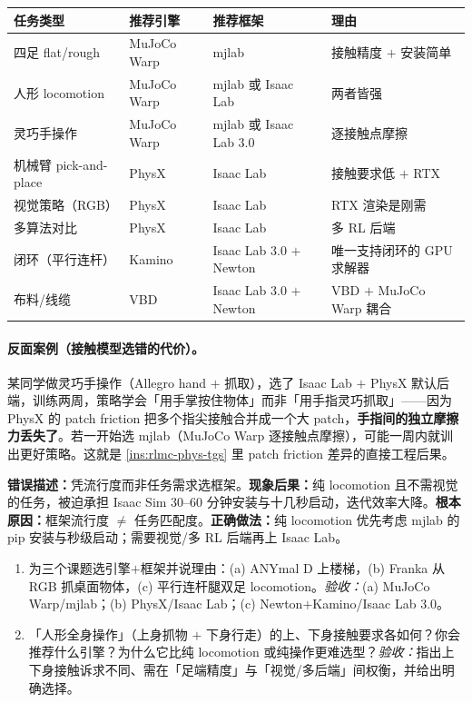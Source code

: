 \begin{center}
\small
\begin{tabular}{@{}llll@{}}
\toprule
任务类型 & 推荐引擎 & 推荐框架 & 理由 \\
\midrule
四足 flat/rough & MuJoCo Warp & mjlab & 接触精度 $+$ 安装简单 \\
人形 locomotion & MuJoCo Warp & mjlab 或 Isaac Lab & 两者皆强 \\
灵巧手操作 & MuJoCo Warp & mjlab 或 Isaac Lab 3.0 & 逐接触点摩擦 \\
机械臂 pick-and-place & PhysX & Isaac Lab & 接触要求低 $+$ RTX \\
视觉策略（RGB） & PhysX & Isaac Lab & RTX 渲染是刚需 \\
多算法对比 & PhysX & Isaac Lab & 多 RL 后端 \\
闭环（平行连杆） & Kamino & Isaac Lab 3.0 $+$ Newton & 唯一支持闭环的 GPU 求解器 \\
布料/线缆 & VBD & Isaac Lab 3.0 $+$ Newton & VBD $+$ MuJoCo Warp 耦合 \\
\bottomrule
\end{tabular}
\end{center}

\paragraph{反面案例（接触模型选错的代价）。}某同学做灵巧手操作（Allegro hand $+$ 抓取），选了 Isaac Lab $+$ PhysX 默认后端，训练两周，策略学会「用手掌按住物体」而非「用手指灵巧抓取」——因为 PhysX 的 patch friction 把多个指尖接触合并成一个大 patch，\textbf{手指间的独立摩擦力丢失了}。若一开始选 mjlab（MuJoCo Warp 逐接触点摩擦），可能一周内就训出更好策略。这就是 \cref{ins:rlmc-phys-tgs} 里 patch friction 差异的直接工程后果。

\begin{pitfall}
\textbf{错误描述：}凭流行度而非任务需求选框架。\textbf{现象后果：}纯 locomotion 且不需视觉的任务，被迫承担 Isaac Sim 30--60 分钟安装与十几秒启动，迭代效率大降。\textbf{根本原因：}框架流行度 $\neq$ 任务匹配度。\textbf{正确做法：}纯 locomotion 优先考虑 mjlab 的 pip 安装与秒级启动；需要视觉/多 RL 后端再上 Isaac Lab。
\end{pitfall}

\begin{practice}[本节练习]
\begin{enumerate}
  \item 为三个课题选引擎$+$框架并说理由：(a) ANYmal D 上楼梯，(b) Franka 从 RGB 抓桌面物体，(c) 平行连杆腿双足 locomotion。\emph{验收：}(a) MuJoCo Warp/mjlab；(b) PhysX/Isaac Lab；(c) Newton$+$Kamino/Isaac Lab 3.0。
  \item 「人形全身操作」（上身抓物 $+$ 下身行走）的上、下身接触要求各如何？你会推荐什么引擎？为什么它比纯 locomotion 或纯操作更难选型？\emph{验收：}指出上下身接触诉求不同、需在「足端精度」与「视觉/多后端」间权衡，并给出明确选择。
\end{enumerate}
\end{practice}

